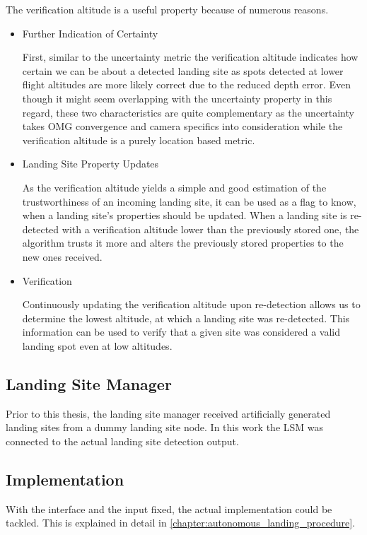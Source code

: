 The verification altitude is a useful property because of numerous reasons.
\begin{itemize}
    \item Further Indication of Certainty

    First, similar to the uncertainty metric the verification altitude indicates how certain we can be about a detected landing site as spots detected at lower flight altitudes are more likely correct due to the reduced depth error. Even though it might seem overlapping with the uncertainty property in this regard, these two characteristics are quite complementary as the uncertainty takes OMG convergence and camera specifics into consideration while the verification altitude is a purely location based metric.
    \item Landing Site Property Updates

    As the verification altitude yields a simple and good estimation of the trustworthiness of an incoming landing site, it can be used as a flag to know, when a landing site's properties should be updated. When a landing site is re-detected with a verification altitude lower than the previously stored one, the algorithm trusts it more and alters the previously stored properties to the new ones received.
    \item Verification

    Continuously updating the verification altitude upon re-detection allows us to determine the lowest altitude, at which a landing site was re-detected. This information can be used to verify that a given site was considered a valid landing spot even at low altitudes. 
\end{itemize}

\subsection{Landing Site Manager}

Prior to this thesis, the landing site manager received artificially generated landing sites from a dummy landing site node. In this work the LSM was connected to the actual landing site detection output. 


\subsection{Implementation}

With the interface and the input fixed, the actual implementation could be tackled. This is explained in detail in \cref{chapter:autonomous_landing_procedure}.
